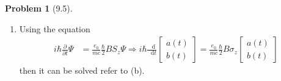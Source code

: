 \documentclass[twoside,11pt]{article}
\renewcommand*\d{\mathop{}\!\mathrm{d}}
\theoremstyle{definition}
\newtheorem{problem}{Problem}
\theoremstyle{remark}
\begin{document}
\begin{problem}[9.5]
\begin{enumerate}[label=(\alph*)]
\item Using the equation 
\begin{align*}
    i\hbar\frac{\partial}{\partial t}\Psi &= \frac{e_0}{mc}\frac{\hbar}{2}BS_z\Psi
    \Rightarrow
    i\hbar\frac{\d}{\d t}\begin{bmatrix}
        a(t)\\ b(t)
    \end{bmatrix} 
    = \frac{e_0}{mc}\frac{\hbar}{2}B\sigma_z\begin{bmatrix}
        a(t)\\ b(t)
    \end{bmatrix}
\end{align*}
then it can be solved refer to (b).



\end{enumerate}
\end{problem}
\end{document}
